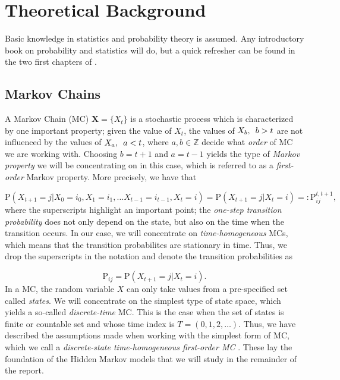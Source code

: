 \documentclass{article}
\begin{document}
\section{Theoretical Background}

Basic knowledge in statistics and probability theory is assumed. Any introductory book on probability and statistics will do, but a quick refresher can be found in the two first chapters of \cite{Pinsky2011}.

\subsection{Markov Chains}
A Markov Chain (MC) $\mathbf{X} = \{X_t\}$ is a stochastic process which is characterized by one important property; given the value of $X_t$, the values of $X_b, \hspace{0.5em} b > t$ are not influenced by the values of $X_a, \hspace{0.5em} a < t$, where $a,b \in \mathbb{Z}$ decide what \textit{order} of MC we are working with. Choosing $b = t+1$ and $a = t-1$ yields the type of \textit{Markov property} we will be concentrating on in this case, which is referred to as a \textit{first-order} Markov property. More precisely, we have that 

\begin{equation*}
     \text{P}(X_{t+1} = j|X_0 = i_0, X_1 = i_1, \ldots X_{t-1} = i_{t-1}, X_t = i) = \text{P}(X_{t+1} = j|X_t = i) =: \text{P}_{ij}^{t, t+1}, 
\end{equation*}
where the superscripts highlight an important point; the \textit{one-step transition probability} does not only depend on the state, but also on the time when the transition occurs. In our case, we will concentrate on \textit{time-homogeneous} MCs, which means that the transition probabilites are stationary in time. Thus, we drop the superscripts in the notation and denote the transition probabilities as 

\begin{equation*}
    \text{P}_{ij} = \text{P}(X_{t+1} = j|X_t = i).
\end{equation*}
In a MC, the random variable $X$ can only take values from a pre-specified set called \textit{states}. We will concentrate on the simplest type of state space, which yields a so-called \textit{discrete-time} MC. This is the case when the set of states is finite or countable set and whose time index is $T = (0,1,2,\ldots)$. Thus, we have described the assumptions made when working with the simplest form of MC, which we call a \textit{discrete-state time-homogeneous first-order MC} \cite{Pinsky2011}. These lay the foundation of the Hidden Markov models that we will study in the remainder of the report. 
\end{document}
